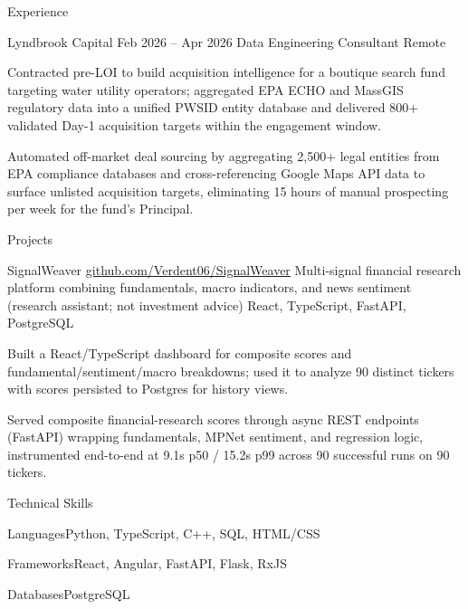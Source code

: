 \documentclass[
	11pt
]{../../../template}
\begin{document}
\begin{rSection}{E}{xperience}
		\begin{rSectionEntry}
			{Lyndbrook Capital}
			{Feb 2026 -- Apr 2026}
			{Data Engineering Consultant}
			{}
			{Remote}

			\item Contracted pre-LOI to build acquisition intelligence for a boutique search fund targeting water utility operators; aggregated EPA ECHO and MassGIS regulatory data into a unified PWSID entity database and delivered 800+ validated Day-1 acquisition targets within the engagement window.
			\item Automated off-market deal sourcing by aggregating 2,500+ legal entities from EPA compliance databases and cross-referencing Google Maps API data to surface unlisted acquisition targets, eliminating 15 hours of manual prospecting per week for the fund's Principal.
		\end{rSectionEntry}
	\end{rSection}

	\begin{rSection}{P}{rojects}
		\begin{rSectionEntry}
			{SignalWeaver}
			{\href{https://github.com/Verdent06/SignalWeaver}{github.com/Verdent06/SignalWeaver}}
			{Multi-signal financial research platform combining fundamentals, macro indicators, and news sentiment (research assistant; not investment advice)}
			{React, TypeScript, FastAPI, PostgreSQL}
			{}

			\item Built a React/TypeScript dashboard for composite scores and fundamental/sentiment/macro breakdowns; used it to analyze 90 distinct tickers with scores persisted to Postgres for history views.
			\item Served composite financial-research scores through async REST endpoints (FastAPI) wrapping fundamentals, MPNet sentiment, and regression logic, instrumented end-to-end at 9.1s p50 / 15.2s p99 across 90 successful runs on 90 tickers.
		\end{rSectionEntry}
	\end{rSection}

	\begin{rSection}{T}{echnical Skills}
		\begin{rSet}{Languages}{Python, TypeScript, C++, SQL, HTML/CSS}
		\end{rSet}
		\begin{rSet}{Frameworks}{React, Angular, FastAPI, Flask, RxJS}
		\end{rSet}
		\begin{rSet}{Databases}{PostgreSQL}
		\end{rSet}
	\end{rSection}
\end{document}
